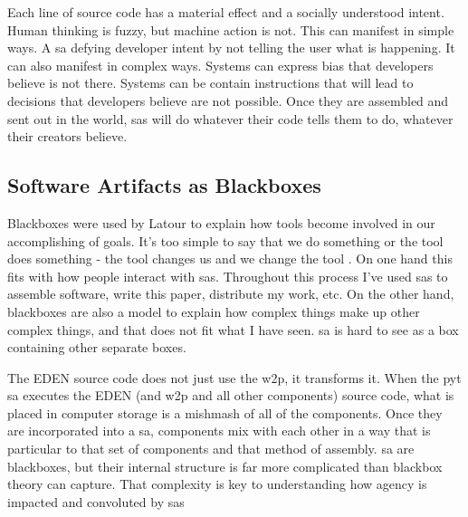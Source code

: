 \documentclass[a4paper,man,natbib,floatsintext]{apa6}
\begin{document}
  Each line of source code has a material effect and a socially understood intent. Human thinking is fuzzy, but machine action is not. This can manifest in simple ways. A \gls{sa} defying developer intent by not telling the user what is happening. It can also manifest in complex ways. Systems can express bias that developers believe is not there. Systems can be contain instructions that will lead to decisions that developers believe are not possible. Once they are assembled and sent out in the world, \glspl{sa} will do whatever their code tells them to do, whatever their creators believe.

  \subsection{Software Artifacts as Blackboxes}
  Blackboxes were used by Latour to explain how tools become involved in our accomplishing of goals. It's too simple to say that we do something or the tool does something - the tool changes us and we change the tool \citep{Latour1999-ui}. On one hand this fits with how people interact with \glspl{sa}. Throughout this process I've used \glspl{sa} to assemble software, write this paper, distribute my work, etc. On the other hand, blackboxes are also a model to explain how complex things make up other complex things, and that does not fit what I have seen. \Gls{sa} is hard to see as a box containing other separate boxes. 

  The \gls{EDEN} source code does not just use the \gls{w2p}, it transforms it. When the \Gls{pyt} \gls{sa} executes the \gls{EDEN} (and \gls{w2p} and all other components) source code, what is placed in computer storage is a mishmash of all of the components. Once they are incorporated into a \gls{sa}, components mix with each other in a way that is particular to that set of components and that method of assembly. \Gls{sa} are blackboxes, but their internal structure is far more complicated than blackbox theory can capture. That complexity is key to understanding how agency is impacted and convoluted by \glspl{sa}

\end{document}
